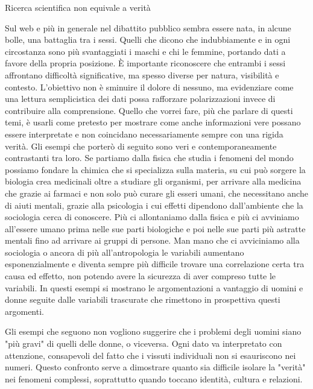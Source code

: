 \documentclass[12pt]{book} %
\begin{document}
\begin{mdframed}[linewidth=1pt]
Ricerca scientifica non equivale a verità

Sul web e più in generale nel dibattito pubblico sembra essere nata, in alcune bolle, una battaglia tra i sessi. Quelli che dicono che indubbiamente e in ogni circostanza sono più svantaggiati i maschi e chi le femmine, portando dati a favore della propria posizione.
È importante riconoscere che entrambi i sessi affrontano difficoltà significative, ma spesso diverse per natura, visibilità e contesto. L'obiettivo non è sminuire il dolore di nessuno, ma evidenziare come una lettura semplicistica dei dati possa rafforzare polarizzazioni invece di contribuire alla comprensione.
Quello che vorrei fare, più che parlare di questi temi, è usarli come pretesto per mostrare come anche informazioni vere possano essere interpretate e non coincidano necessariamente sempre con una rigida verità. Gli esempi che porterò di seguito sono veri e contemporaneamente contrastanti tra loro. 
Se partiamo dalla fisica che studia i fenomeni del mondo possiamo fondare la chimica che si specializza sulla materia, su cui può sorgere la biologia crea medicinali oltre a studiare gli organismi, per arrivare alla medicina che grazie ai farmaci e non solo può curare gli esseri umani, che necessitano anche di aiuti mentali, grazie alla psicologia i cui effetti dipendono dall'ambiente che la sociologia cerca di conoscere. Più ci allontaniamo dalla fisica e più ci avviniamo all'essere umano prima nelle sue parti biologiche e poi nelle sue parti più astratte mentali fino ad arrivare ai gruppi di persone. Man mano che ci avviciniamo alla sociologia o ancora di più all'antropologia le variabili aumentano esponenzialmente e diventa sempre più difficile trovare una correlazione certa tra causa ed effetto, non potendo avere la sicurezza di aver compreso tutte le variabili. 
In questi esempi si mostrano le argomentazioni a vantaggio di uomini e donne seguite dalle variabili trascurate che rimettono in prospettiva questi argomenti.

Gli esempi che seguono non vogliono suggerire che i problemi degli uomini siano "più gravi" di quelli delle donne, o viceversa. Ogni dato va interpretato con attenzione, consapevoli del fatto che i vissuti individuali non si esauriscono nei numeri. Questo confronto serve a dimostrare quanto sia difficile isolare la "verità" nei fenomeni complessi, soprattutto quando toccano identità, cultura e relazioni.


\end{mdframed}
\end{document}
